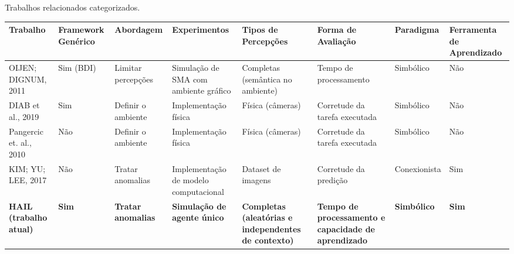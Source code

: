 \begin{landscape}



\begin{quadro}[]
\caption{Trabalhos relacionados categorizados.}
 \makegapedcells
\begin{tabular}{|P{2.3cm} |P{2.5cm}|P{2.5cm}|P{3cm}|P{2.5cm}|P{3.5cm}|P{2.3cm}|P{2.5cm}|}
\hline

\textbf{Trabalho}       & \textbf{Framework Genérico} & \textbf{Abordagem} & \textbf{Experimentos}                 & \textbf{Tipos de Percepções}                       & \textbf{Forma de Avaliação}                        & \textbf{Paradigma} & \textbf{Ferramenta de Aprendizado} \\ \hline
OIJEN; DIGNUM, 2011     & Sim (BDI)                   & Limitar percepções & Simulação de SMA com ambiente gráfico & Completas (semântica no ambiente)                  & Tempo de processamento                             & Simbólico          & Não                                \\ \hline

DIAB et al., 2019       & Sim                         & Definir o ambiente & Implementação física                  & Física (câmeras)                                   & Corretude da tarefa executada                      & Simbólico          & Não                                \\ \hline
Pangercic et. al., 2010 & Não                         & Definir o ambiente & Implementação física                  & Física (câmeras)                                   & Corretude da tarefa executada                      & Simbólico          & Não                                \\ \hline

KIM; YU; LEE, 2017      & Não                         & Tratar anomalias   & Implementação de modelo computacional & Dataset de imagens                                 & Corretude da predição                              & Conexionista       & Sim                                \\ \hline
\textbf{HAIL (trabalho atual)}          & \textbf{Sim}                         & \textbf{Tratar anomalias}   & \textbf{Simulação de agente único}             & \textbf{Completas (aleatórias e independentes de contexto)} & \textbf{Tempo de processamento e capacidade de aprendizado} & \textbf{Simbólico}          & \textbf{Sim}                                \\ \hline
\end{tabular}
 \label{tab:relacionados}
\end{quadro}

\end{landscape}


